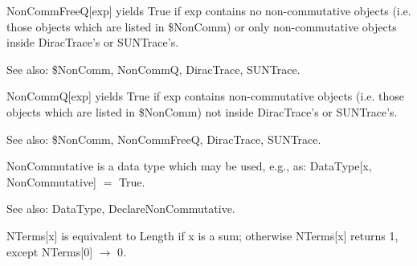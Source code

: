 

NonCommFreeQ[exp] yields True if exp contains no non-commutative objects (i.e. those objects which are listed in \${}NonComm) or only
  non-commutative objects inside DiracTrace's or SUNTrace's.

See also:  \${}NonComm, NonCommQ, DiracTrace, SUNTrace.



NonCommQ[exp] yields True if exp contains non-commutative objects (i.e. those objects which are listed in \${}NonComm) not inside
  DiracTrace's or SUNTrace's.

See also:  \${}NonComm, NonCommFreeQ, DiracTrace, SUNTrace.



NonCommutative is a data type which may be used, e.g., { }as: DataType[x, NonCommutative] \(=\) True.

See also: DataType, DeclareNonCommutative.



NTerms[x] is equivalent to Length if x is a sum; otherwise NTerms[x] returns 1, except NTerms[0] \(\rightarrow \) 0.











